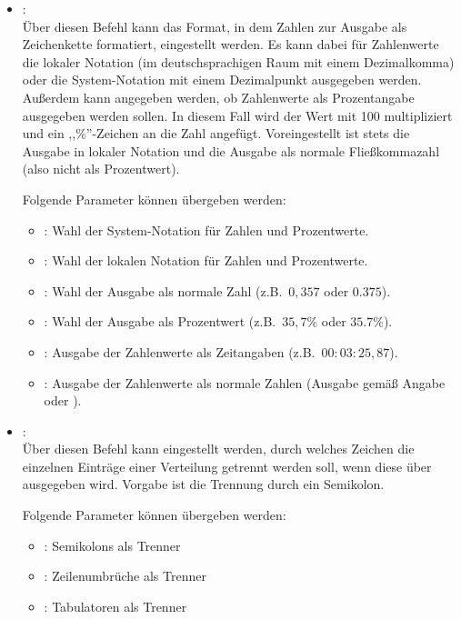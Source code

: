 \begin{itemize}

\item
{}:\\
Über diesen Befehl kann das Format, in dem  Zahlen zur Ausgabe als Zeichenkette
formatiert, eingestellt werden. Es kann dabei für Zahlenwerte die lokaler Notation (im deutschsprachigen
Raum mit einem Dezimalkomma) oder die System-Notation mit einem Dezimalpunkt ausgegeben werden. Außerdem
kann angegeben werden, ob Zahlenwerte als Prozentangabe ausgegeben werden sollen. In diesem Fall wird
der Wert mit 100 multipliziert und ein ,,\%''-Zeichen an die Zahl angefügt. Voreingestellt ist stets die
Ausgabe in lokaler Notation und die Ausgabe als normale Fließkommazahl (also nicht als Prozentwert).

Folgende Parameter können  übergeben werden:
\begin{itemize}
\item
{}:
Wahl der System-Notation für Zahlen und Prozentwerte.
\item
{}:
Wahl der lokalen Notation für Zahlen und Prozentwerte.
\item
{}:
Wahl der Ausgabe als normale Zahl (z.B.\ $0{,}357$ oder $0.375$).
\item
{}:
Wahl der Ausgabe als Prozentwert (z.B.\ $35{,}7\%$ oder $35.7\%$).
\item
{}:
Ausgabe der Zahlenwerte als Zeitangaben (z.B.\ $00{:}03{:}25{,}87$).
\item
{}:
Ausgabe der Zahlenwerte als normale Zahlen (Ausgabe gemäß Angabe  oder ).
\end{itemize}
	
\item
{}:\\
Über diesen Befehl kann eingestellt werden, durch welches Zeichen die einzelnen Einträge
einer Verteilung getrennt werden soll, wenn diese über  ausgegeben wird.
Vorgabe ist die Trennung durch ein Semikolon.

Folgende Parameter können  übergeben werden:
\begin{itemize}
\item
{}:
Semikolons als Trenner
\item
{}:
Zeilenumbrüche als Trenner
\item
{}:
Tabulatoren als Trenner
\end{itemize}

\end{itemize}

